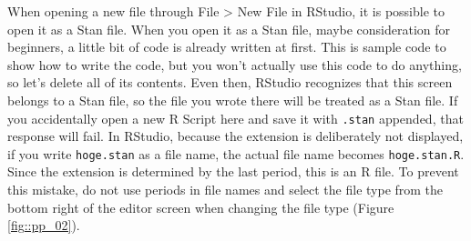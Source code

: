\documentclass{ltjsbook}
\begin{document}
When opening a new file through File > New File in RStudio, it is possible to open it as a Stan file. When you open it as a Stan file, maybe consideration for beginners, a little bit of code is already written at first. This is sample code to show how to write the code, but you won't actually use this code to do anything, so let's delete all of its contents. Even then, RStudio recognizes that this screen belongs to a Stan file, so the file you wrote there will be treated as a Stan file. If you accidentally open a new R Script here and save it with \verb|.stan| appended, that response will fail. In RStudio, because the extension is deliberately not displayed, if you write \verb|hoge.stan| as a file name, the actual file name becomes \verb|hoge.stan.R|. Since the extension is determined by the last period, this is an R file. To prevent this mistake, do not use periods in file names and select the file type from the bottom right of the editor screen when changing the file type (Figure \ref{fig::pp_02}).


\end{document}
